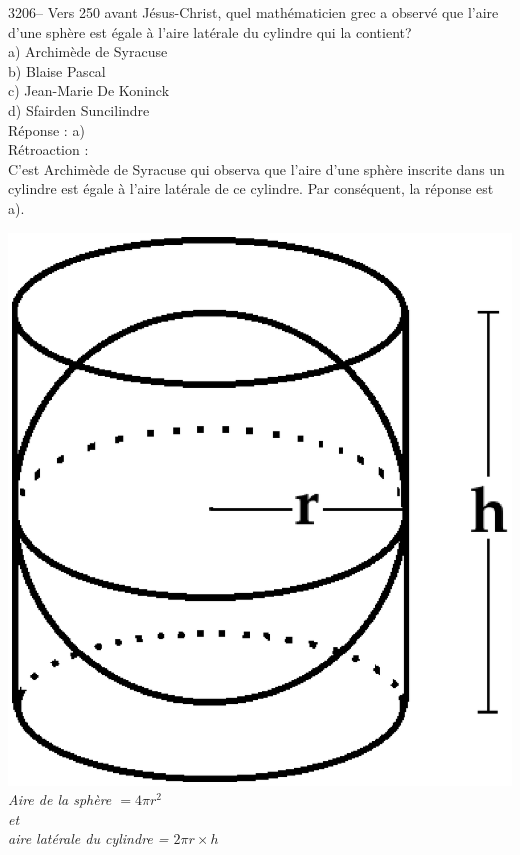 \documentclass[letterpaper, 12pt]{article}
\begin{document}
3206-- Vers 250 avant J\'esus-Christ, quel math\'ematicien grec a observ\'e que l'aire d'une sph\`ere est \'egale \`a l'aire lat\'erale du cylindre qui la contient?\\

a) Archim\`ede de Syracuse\\
b) Blaise Pascal\\
c) Jean-Marie De Koninck\\
d) Sfairden Suncilindre\\

R\'eponse : a)\\

R\'etroaction :\\
C'est Archim\`ede de Syracuse qui observa que l'aire d'une sph\`ere inscrite dans un cylindre est \'egale \`a l'aire lat\'erale de ce cylindre. Par cons\'equent, la r\'eponse est a).
\begin{center}
\includegraphics[scale=0.25]{sphere_cylindre}\\
\emph{Aire de la sph\`ere $= 4\pi r^{2}$\\
et\\
aire lat\'erale du cylindre = $2\pi r \times h$}
\end{center}
\end{document}
